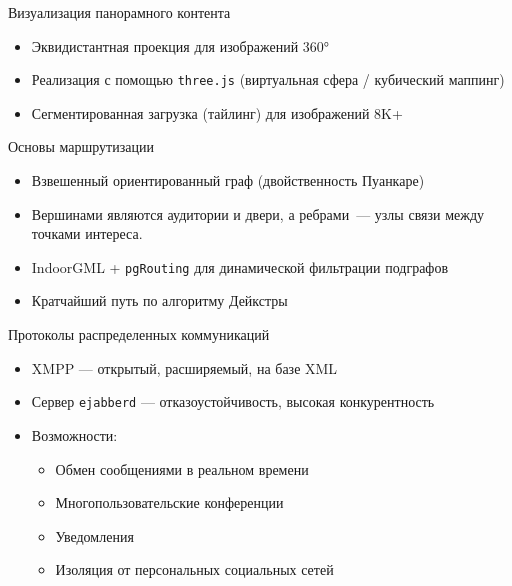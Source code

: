 \documentclass[10pt, aspectratio=169]{beamer}
\begin{document}
\begin{frame}{Визуализация панорамного контента}
	\begin{itemize}
		\item Эквидистантная проекция для изображений 360°
		\item Реализация с помощью \texttt{three.js} (виртуальная сфера / кубический маппинг)
		\item Сегментированная загрузка (тайлинг) для изображений 8K+
	\end{itemize}
\end{frame}

\begin{frame}{Основы маршрутизации}
	\begin{itemize}
		\item Взвешенный ориентированный граф (двойственность Пуанкаре)
		\item Вершинами являются аудитории и двери, а ребрами~--- узлы связи между точками интереса.
		\item IndoorGML + \texttt{pgRouting} для динамической фильтрации подграфов
		\item Кратчайший путь по алгоритму Дейкстры
	\end{itemize}
\end{frame}

\begin{frame}{Протоколы распределенных коммуникаций}
	\begin{itemize}
		\item XMPP --- открытый, расширяемый, на базе XML
		\item Сервер \texttt{ejabberd} --- отказоустойчивость, высокая конкурентность
		\item Возможности:
		      \begin{itemize}
			      \item Обмен сообщениями в реальном времени
			      \item Многопользовательские конференции
			      \item Уведомления
			      \item Изоляция от персональных социальных сетей
		      \end{itemize}
	\end{itemize}
\end{frame}
\end{document}
